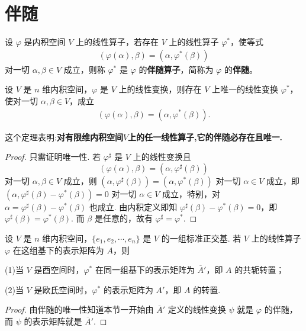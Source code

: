 \documentclass[../../main.tex]{subfiles}
\begin{document}
\section{伴随}

\begin{definition}[伴随]
设 $\varphi$ 是内积空间 $V$ 上的线性算子，若存在 $V$ 上的线性算子 $\varphi^*$，使等式
\begin{align*}
(\varphi(\alpha),\beta) = (\alpha,\varphi^*(\beta))
\end{align*}
对一切 $\alpha,\beta \in V$ 成立，则称 $\varphi^*$ 是 $\varphi$ 的\textbf{伴随算子}，简称为 $\varphi$ 的\textbf{伴随}。
\end{definition}

\begin{theorem}
设 $V$ 是 $n$ 维内积空间，$\varphi$ 是 $V$ 上的线性变换，则存在 $V$ 上唯一的线性变换 $\varphi^*$，使对一切 $\alpha,\beta \in V$，成立
\begin{align*}
(\varphi(\alpha),\beta) = (\alpha,\varphi^*(\beta)).
\end{align*}
\end{theorem}
\begin{note}
这个定理表明:\textbf{对有限维内积空间$V$上的任一线性算子,它的伴随必存在且唯一.}
\end{note}
\begin{proof}
只需证明唯一性. 若 $\varphi^{\sharp}$ 是 $V$ 上的线性变换且
\[
(\varphi(\alpha),\beta) = (\alpha,\varphi^{\sharp}(\beta))
\]
对一切 $\alpha,\beta \in V$ 成立，则 $(\alpha,\varphi^{\sharp}(\beta)) = (\alpha,\varphi^*(\beta))$ 对一切 $\alpha \in V$ 成立，即 $(\alpha,\varphi^{\sharp}(\beta) - \varphi^*(\beta)) = 0$ 对一切 $\alpha \in V$ 成立，特别，对 $\alpha = \varphi^{\sharp}(\beta) - \varphi^*(\beta)$ 也成立. 由内积定义即知 $\varphi^{\sharp}(\beta) - \varphi^*(\beta) = 0$，即 $\varphi^{\sharp}(\beta) = \varphi^*(\beta)$. 而 $\beta$ 是任意的，故有 $\varphi^{\sharp} = \varphi^*$.
\end{proof}

\begin{theorem}\label{theorem:伴随算子的矩阵}
设 $V$ 是 $n$ 维内积空间，$\{e_1,e_2,\cdots,e_n\}$ 是 $V$ 的一组标准正交基. 若 $V$ 上的线性算子 $\varphi$ 在这组基下的表示矩阵为 $A$，则

(1)当 $V$ 是酉空间时，$\varphi^*$ 在同一组基下的表示矩阵为 $\overline{A}'$，即 $A$ 的共轭转置；

(2)当 $V$ 是欧氏空间时，$\varphi^*$ 的表示矩阵为 $A'$，即 $A$ 的转置.
\end{theorem}
\begin{proof}
由伴随的唯一性知道本节一开始由 $\overline{A}'$ 定义的线性变换 $\psi$ 就是 $\varphi$ 的伴随，而 $\psi$ 的表示矩阵就是 $\overline{A}'$. 
\end{proof}
\end{document}
